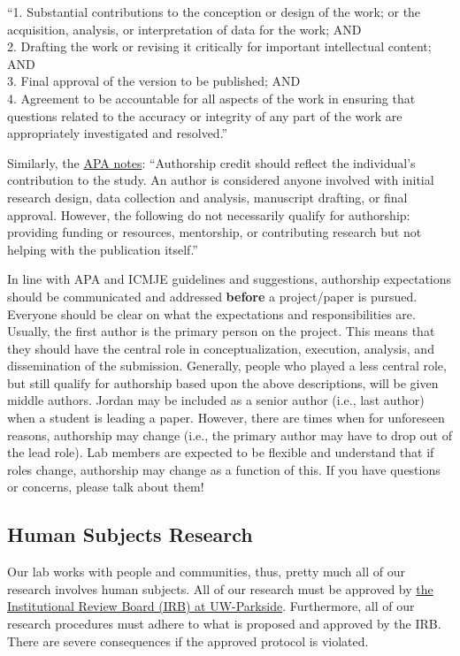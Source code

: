 \documentclass[
]{book}
\begin{document}
``1. Substantial contributions to the conception or design of the work; or the acquisition, analysis, or interpretation of data for the work; AND\\
2. Drafting the work or revising it critically for important intellectual content; AND\\
3. Final approval of the version to be published; AND\\
4. Agreement to be accountable for all aspects of the work in ensuring that questions related to the accuracy or integrity of any part of the work are appropriately investigated and resolved.''

Similarly, the \href{https://www.apa.org/research/responsible/publication}{APA notes}: ``Authorship credit should reflect the individual's contribution to the study. An author is considered anyone involved with initial research design, data collection and analysis, manuscript drafting, or final approval. However, the following do not necessarily qualify for authorship: providing funding or resources, mentorship, or contributing research but not helping with the publication itself.''

In line with APA and ICMJE guidelines and suggestions, authorship expectations should be communicated and addressed \textbf{before} a project/paper is pursued. Everyone should be clear on what the expectations and responsibilities are. Usually, the first author is the primary person on the project. This means that they should have the central role in conceptualization, execution, analysis, and dissemination of the submission. Generally, people who played a less central role, but still qualify for authorship based upon the above descriptions, will be given middle authors. Jordan may be included as a senior author (i.e., last author) when a student is leading a paper. However, there are times when for unforeseen reasons, authorship may change (i.e., the primary author may have to drop out of the lead role). Lab members are expected to be flexible and understand that if roles change, authorship may change as a function of this. If you have questions or concerns, please talk about them!

\hypertarget{human-subjects-research}{%
\subsection{Human Subjects Research}\label{human-subjects-research}}

Our lab works with people and communities, thus, pretty much all of our research involves human subjects. All of our research must be approved by \href{https://www.uwp.edu/explore/offices/researchadmin/irb.cfm}{the Institutional Review Board (IRB) at UW-Parkside}. Furthermore, all of our research procedures must adhere to what is proposed and approved by the IRB. There are severe consequences if the approved protocol is violated.
\end{document}
